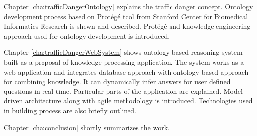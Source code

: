 \bigskip

\noindent Chapter \ref{cha:trafficDangerOntology} explains the traffic danger concept. Ontology development process based on Protégé tool from Stanford Center for Biomedical Informatics Research is shown and described. Protégé and knowledge engineering approach used for ontology development is introduced.

\bigskip

\noindent Chapter \ref{cha:trafficDangerWebSystem} shows ontology-based reasoning system built as a proposal of knowledge processing application. The system works as a web application and integrates database approach with ontology-based approach for combining knowledge. It can dynamically infer answers for user defined questions in real time. Particular parts of the application are explained. Model-driven architecture along with agile methodology is introduced. Technologies used in building process are also briefly outlined.

\bigskip

\noindent Chapter \ref{cha:conclusion} shortly summarizes the work.
